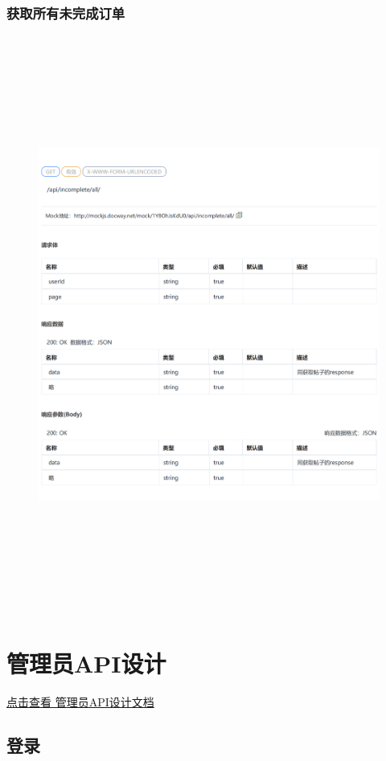         \subsubsection{获取所有未完成订单}
        \begin{figure}[h]
            \centering
            \includegraphics[height=19.0cm,width=14.0cm]{design/image/api32.png} 
            \end{figure}  
            \newpage
\section{管理员API设计}
\href{https://documentation-1303131952.cos.ap-beijing.myqcloud.com/iron_man/%E7%AE%A1%E7%90%86%E5%91%98API%E6%96%87%E6%A1%A3.pdf}{点击查看 管理员API设计文档}
\subsection{登录}
